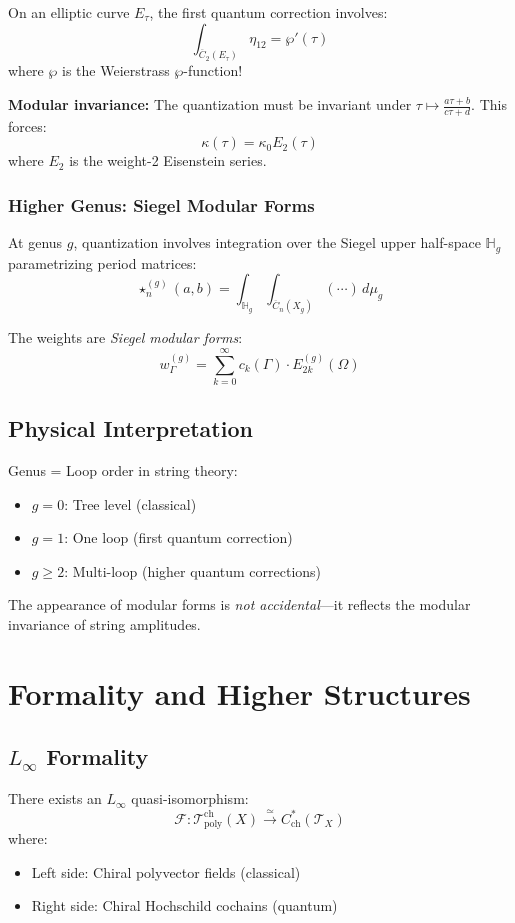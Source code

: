 On an elliptic curve $E_\tau$, the first quantum correction involves:
$$\int_{\overline{C}_2(E_\tau)} \eta_{12} = \wp'(\tau)$$
where $\wp$ is the Weierstrass $\wp$-function!

\textbf{Modular invariance:}
The quantization must be invariant under $\tau \mapsto \frac{a\tau+b}{c\tau+d}$. This forces:
$$\kappa(\tau) = \kappa_0 E_2(\tau)$$
where $E_2$ is the weight-2 Eisenstein series.

\subsubsection{Higher Genus: Siegel Modular Forms}

At genus $g$, quantization involves integration over the Siegel upper half-space $\mathbb{H}_g$ parametrizing period matrices:
$$\star^{(g)}_n(a,b) = \int_{\mathbb{H}_g} \int_{\overline{C}_n(X_g)} (\cdots) \, d\mu_g$$

The weights are \emph{Siegel modular forms}:
$$w_\Gamma^{(g)} = \sum_{k=0}^\infty c_k(\Gamma) \cdot E_{2k}^{(g)}(\Omega)$$

\subsection{Physical Interpretation}

Genus = Loop order in string theory:
\begin{itemize}
\item $g=0$: Tree level (classical)
\item $g=1$: One loop (first quantum correction)
\item $g \geq 2$: Multi-loop (higher quantum corrections)
\end{itemize}

The appearance of modular forms is \emph{not accidental}—it reflects the modular invariance of string amplitudes.

\section{Formality and Higher Structures}

\subsection{$L_\infty$ Formality}

\begin{theorem}
There exists an $L_\infty$ quasi-isomorphism:
$$\mathcal{F}: \mathcal{T}_{\text{poly}}^{\text{ch}}(X) \xrightarrow{\simeq} C^*_{\text{ch}}(\mathcal{T}_X)$$
where:
\begin{itemize}
\item Left side: Chiral polyvector fields (classical)
\item Right side: Chiral Hochschild cochains (quantum)
\end{itemize}
\end{theorem}


